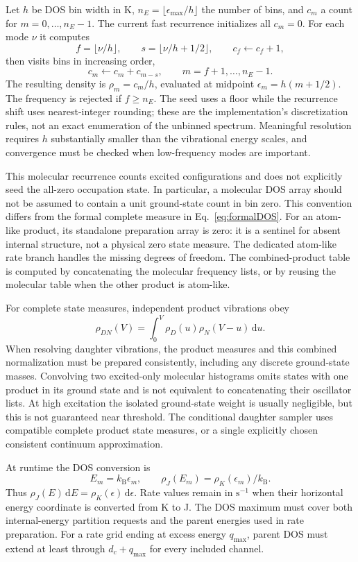 \documentclass[10pt,a4paper]{article}
\newcommand{\dd}{\,\mathrm d}
\newcommand{\kb}{k_{\mathrm B}}
\begin{document}
Let $h$ be DOS bin width in K, $n_E=\lfloor\epsilon_{\max}/h\rfloor$ the
number of bins, and $c_m$ a count for $m=0,\ldots,n_E-1$. The current fast
recurrence initializes all $c_m=0$. For each mode $\nu$ it computes
\[
 f=\lfloor\nu/h\rfloor,\qquad s=\lfloor\nu/h+1/2\rfloor,
 \qquad c_f\gets c_f+1,
\]
then visits bins in increasing order,
\[
 c_m\gets c_m+c_{m-s},\qquad m=f+1,\ldots,n_E-1.
\]
The resulting density is $\rho_m=c_m/h$, evaluated at midpoint
$\epsilon_m=h(m+1/2)$. The frequency is rejected if $f\geq n_E$.
The seed uses a floor while the recurrence shift uses nearest-integer rounding;
these are the implementation's discretization rules, not an exact enumeration
of the unbinned spectrum. Meaningful resolution requires $h$ substantially
smaller than the vibrational energy scales, and convergence must be checked
when low-frequency modes are important.

This molecular recurrence counts excited configurations and does not explicitly
seed the all-zero occupation state. In particular, a molecular DOS array should
not be assumed to contain a unit ground-state count in bin zero. This convention
differs from the formal complete measure in Eq.~\eqref{eq:formalDOS}.
For an atom-like product, its standalone preparation array is zero: it is a
sentinel for absent internal structure, not a physical zero state measure.
The dedicated atom-like rate branch handles the missing degrees of freedom.
The combined-product table is computed by concatenating the molecular frequency
lists, or by reusing the molecular table when the other product is atom-like.

For complete state measures, independent product vibrations obey
\[
 \rho_{DN}(V)=\int_0^V\rho_D(u)\rho_N(V-u)\dd u.
\]
When resolving daughter vibrations, the product measures and this combined
normalization must be prepared consistently, including any discrete
ground-state masses. Convolving two excited-only molecular histograms omits
states with one product in its ground state and is not equivalent to
concatenating their oscillator lists. At high excitation the isolated
ground-state weight is usually negligible, but this is not guaranteed near
threshold. The conditional daughter sampler uses compatible complete product
state measures, or a single explicitly chosen consistent continuum approximation.

At runtime the DOS conversion is
\[
 E_m=\kb\epsilon_m,\qquad
 \rho_J(E_m)=\rho_K(\epsilon_m)/\kb.
\]
Thus $\rho_J(E)\dd E=\rho_K(\epsilon)\dd\epsilon$.
Rate values remain in $\mathrm{s^{-1}}$ when their horizontal energy coordinate
is converted from K to J. The DOS maximum must cover both internal-energy
partition requests and the parent energies used in rate preparation. For a rate
grid ending at excess energy $q_{\max}$, parent DOS must extend at least through
$d_c+q_{\max}$ for every included channel.
\end{document}
